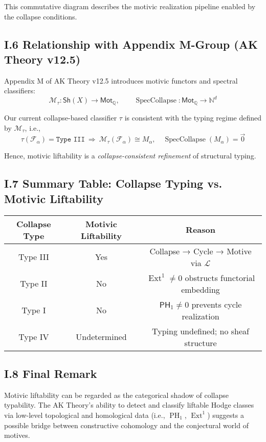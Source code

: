\documentclass[11pt]{article}
\DeclareMathOperator{\Ext}{Ext}
\DeclareMathOperator{\PH}{PH}
\begin{document}
This commutative diagram describes the motivic realization pipeline enabled by the collapse conditions.

\subsection*{I.6 Relationship with Appendix M-Group (AK Theory v12.5)}

Appendix M of AK Theory v12.5 introduces motivic functors and spectral classifiers:
\[
\mathcal{M}_\tau : \mathsf{Sh}(X) \to \mathsf{Mot}_\mathbb{Q}, \qquad \operatorname{SpecCollapse}: \mathsf{Mot}_\mathbb{Q} \to \mathbb{N}^d
\]

Our current collapse-based classifier $\tau$ is consistent with the typing regime defined by $\mathcal{M}_\tau$, i.e.,
\[
\tau(\mathcal{F}_\alpha) = \texttt{Type III} \ \Longrightarrow \ \mathcal{M}_\tau(\mathcal{F}_\alpha) \cong M_\alpha, \quad \operatorname{SpecCollapse}(M_\alpha) = \vec{0}
\]

Hence, motivic liftability is a \emph{collapse-consistent refinement} of structural typing.

\subsection*{I.7 Summary Table: Collapse Typing vs. Motivic Liftability}

\begin{center}
\begin{tabular}{|c|c|c|}
\hline
\textbf{Collapse Type} & \textbf{Motivic Liftability} & \textbf{Reason} \\
\hline
Type III & Yes & Collapse → Cycle → Motive via $\mathcal{L}$ \\
\hline
Type II & No & $\Ext^1 \ne 0$ obstructs functorial embedding \\
\hline
Type I & No & $\mathsf{PH}_1 \ne 0$ prevents cycle realization \\
\hline
Type IV & Undetermined & Typing undefined; no sheaf structure \\
\hline
\end{tabular}
\end{center}

\subsection*{I.8 Final Remark}

Motivic liftability can be regarded as the categorical shadow of collapse typability. The AK Theory's ability to detect and classify liftable Hodge classes via low-level topological and homological data (i.e., $\PH_1$, $\Ext^1$) suggests a possible bridge between constructive cohomology and the conjectural world of motives.
\end{document}
